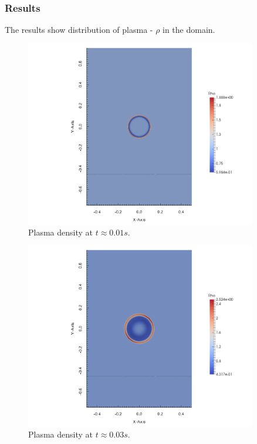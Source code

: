 \subsubsection{Results}
The results show distribution of plasma - $\rho$ in the domain.
\begin{figure}[H]
    \vspace{-5mm}
\begin{center}
    \includegraphics[width=0.9\textwidth]{img/density-1.png}
\end{center} 
\vspace{-10mm}
\caption{Plasma density at $t \approx 0.01s$.}
\end{figure} 
\begin{figure}[H]
    \vspace{-5mm}
    \begin{center}
        \includegraphics[width=0.9\textwidth]{img/density-5.png}
    \end{center}
    \vspace{-10mm}
    \caption{Plasma density at $t \approx 0.03s$.}
\end{figure} 
